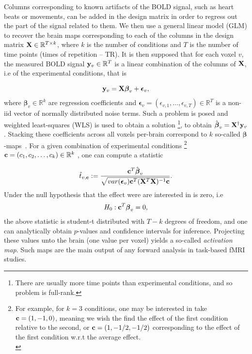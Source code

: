 Columns corresponding to known artifacts of the BOLD signal, such as heart
beats or movements, can be added in the design matrix in order to regress out
the part of the signal related to them. We then use a general linear model (GLM) to
recover the brain maps corresponding to each of the columns in the design
matrix $\mathbf{X} \in \mathbb R^{T \times k}$, where $k$ is the number of conditions and $T$ is the number of time points (times of repetition -- TR).  It is then supposed that for each voxel $v$, the measured BOLD signal $\mathbf{y}_v \in \mathbb R^T$ is a linear combination of the columns of $\mathbf{X}$, i.e of the experimental conditions, that is

\begin{equation}
  \mathbf{y}_v = \mathbf{X}\boldsymbol{\beta}_v + \boldsymbol{\epsilon}_v,
\end{equation}
where $\boldsymbol{\beta}_v \in \mathbb R^k$ are regression coefficients and $\boldsymbol{\epsilon}_v = (\epsilon_{v,1},\ldots,\epsilon_{v,T}) \in \mathbb R^T$ is a non-iid vector of normally distributed noise terms.
Such a problem is posed and weighted least-squares (WLS) is used to obtain a solution
\footnote{There are usually more time points than experimental conditions, and so problem is full-rank.},
to obtain $\hat{\boldsymbol{\beta}}_v = \mathbf{X}^\dagger\mathbf{y}_v$.  Stacking these coefficients across all voxels per-brain correspond to $k$ so-called $\boldsymbol{\beta}$-maps~\citep{friston1994statistical}. For a given combination of experimental conditions \footnote{For example, for $k = 3$ conditions, one may be interested in take $\mathbf{c} = (1, -1, 0)$, meaning we wish the find the effect of the first condition relative to the second, or $\mathbf{c}=(1,-1/2,-1/2)$ corresponding to the effect of the first condition w.r.t the average effect.\\}
$\mathbf{c}  = (c_1,c_2,\ldots,c_k)\in \mathbb R^k$ , one can compute a statistic

\begin{equation}
\hat{t}_{v,\mathbf{c}} := \frac{\mathbf{c}^T\hat{\boldsymbol{\beta}}_v}{\sqrt{var(\boldsymbol{\epsilon}_v)\mathbf{c}^T(\mathbf{X}^T\mathbf{X})^{-1}\mathbf{c}}}.
\end{equation}
Under the null hypothesis that the effect were are interested in is zero, i.e
\begin{equation}
  H_0: \mathbf{c}^T\boldsymbol{\beta}_v = 0,
\end{equation}
the above statistic is student-t distributed with $T-k$ degrees of freedom, and one can
analytically obtain $p$-values and confidence intervals for inference. Projecting these values unto the brain (one value per voxel) yields a so-called \textit{activation map}. Such maps are the main output of any forward analysis in task-based fMRI studies.

